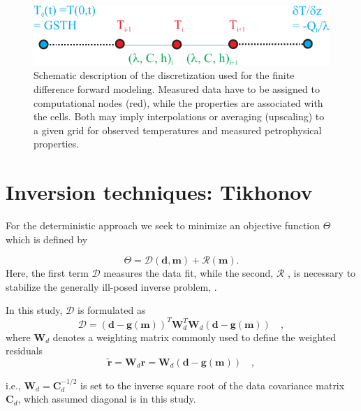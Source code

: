 \documentclass[cp]{copernicus}
\begin{document}
\begin{figure}[htp]
 \centering
 \includegraphics[width=\columnwidth]{Figures/FDScheme}
 \caption[Schematic description of the finite difference discretization.]{Schematic description of 
the discretization used for 
the finite difference forward modeling. Measured data have to be assigned to 
computational nodes (red), while the properties are associated with the cells. 
Both may imply interpolations or averaging (upscaling) to a given grid for 
observed temperatures and measured petrophysical properties.}
\label{fig:FD}
\end{figure}



\section{Inversion techniques: Tikhonov}
\label{app:tikh}
For the deterministic approach we seek to minimize an objective function 
$\Theta$ which is defined by

\begin{equation}\label{eqn:4}
\Theta  = \mathcal{D}\left(\mathbf{d},\mathbf{m}\right) + \mathcal{R}\left(\mathbf{m} \right).
\end{equation} 
\noindent Here, the first term $\mathcal{D}$ measures the data fit, while the
second, $\mathcal{R}$ , is necessary to stabilize the generally ill-posed 
inverse problem, \cite[see][]{Aster2013a}. 

In this study, $\mathcal{D}$ is formulated as
\begin{equation} 
\mathcal{D} = 
 \left(\mathbf{d} - \mathbf{g(m)}\right)^T \mathbf{W}_d^T 
 \mathbf{W}_d^{}\left(\mathbf{d} - \mathbf{g(m)} \right)\quad,
\end{equation} 
\noindent where $\mathbf{W}_d$ denotes a weighting matrix commonly used to 
define the weighted residuals 
\begin{equation*}
\tilde{ \mathbf{r}} =\mathbf{W}_d^{}\mathbf{r} = 
\mathbf{W}_d^{} \left(\mathbf{d}-\mathbf{g}(\mathbf{m})\right)\quad, 
\end{equation*}

\noindent i.e., $\mathbf{W}_d = \mathbf{C}_d^{-1/2}$ is set to the inverse square root of the data 
covariance matrix $\mathbf{C}_d$, which assumed diagonal is in this study. 
\end{document}
